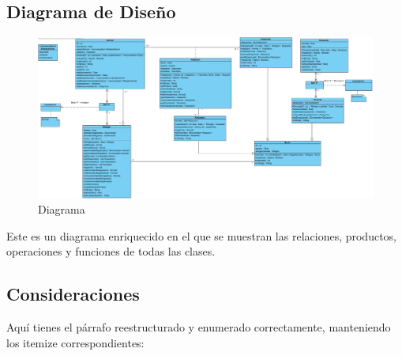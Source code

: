 \newpage
\subsection{Diagrama de Diseño}

\begin{figure}[H]
    \centering
     \includegraphics[width=1\linewidth]{assets/Diagrama.jpg}
     \caption{Diagrama}
\end{figure}

Este es un diagrama enriquecido en el que se muestran las relaciones, productos, operaciones y funciones de todas las clases.

\subsection{Consideraciones}\label{page:Consideraciones}

Aquí tienes el párrafo reestructurado y enumerado correctamente, manteniendo los itemize correspondientes:

